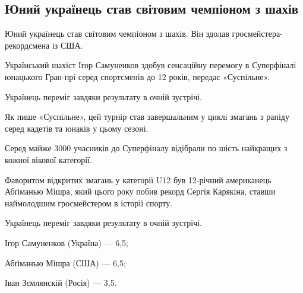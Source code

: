  
 
 
 
 
\subsection{Юний українець став світовим чемпіоном з шахів}
\label{sec:25_12_2021.stz.news.ua.volyn.1.chess_ukrainec_pobeda}

\begin{multicols}{2} %
\setlength{\parindent}{0pt}


Юний українець став світовим чемпіоном з шахів. Він здолав гросмейстера-рекордсмена із США.

Український шахіст Ігор Самуненков здобув сенсаційну перемогу в Суперфіналі
юнацького Гран-прі серед спортсменів до 12 років, передає «Суспільне».

\begin{zznagolos}
Українець переміг завдяки результату в очній зустрічі.	
\end{zznagolos}

Як пише «Суспільне», цей турнір став завершальним у циклі змагань з рапіду
серед кадетів та юнаків у цьому сезоні.

Серед майже 3000 учасників до Суперфіналу відібрали по шість найкращих з кожної
вікової категорії.

Фаворитом відкритих змагань у категорії U12 був 12-річний американець Абґіманью
Мішра, який цього року побив рекорд Сергія Карякіна, ставши наймолодшим
гросмейстером в історії спорту.

Українець переміг завдяки результату в очній зустрічі.

Ігор Самуненков (Україна) — 6,5;

Абґіманью Мішра (США) — 6,5;

Іван Зємлянскій (Росія) — 3,5.
\end{multicols} %
